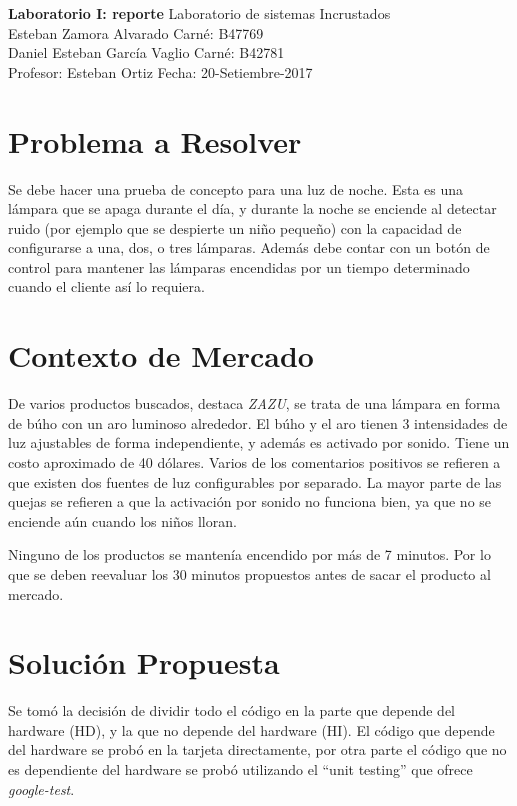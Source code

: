 

\noindent
\large\textbf{Laboratorio I: reporte} \hfill Laboratorio de sistemas Incrustados \\
\normalsize Esteban Zamora Alvarado \hfill Carné: B47769 \\
Daniel Esteban García Vaglio \hfill Carné: B42781 \\
Profesor: Esteban Ortiz  \hfill Fecha: 20-Setiembre-2017 \\

\section{Problema a Resolver}
Se debe hacer una prueba de concepto para una luz de noche. Esta es una lámpara que se apaga durante
el día, y durante la noche se enciende al detectar ruido (por ejemplo que se despierte un niño pequeño)
con la capacidad de configurarse a una, dos, o tres lámparas. Además debe contar con un botón de
control para mantener las lámparas encendidas por un tiempo determinado cuando el cliente así lo
requiera. 

\section{Contexto de Mercado}

De varios productos buscados, destaca \textit{ZAZU}, se trata de una lámpara en forma de búho con un
aro luminoso alrededor. El búho y el aro tienen 3 intensidades de luz ajustables de forma
independiente, y además es activado por sonido. Tiene un costo aproximado de 40 dólares. Varios de
los comentarios positivos se refieren a que existen dos fuentes de luz configurables por
separado. La mayor parte de las quejas se refieren a que la activación por sonido no funciona bien,
ya que no se enciende aún cuando los niños lloran.

Ninguno de los productos se mantenía encendido por más de 7 minutos. Por lo que se deben reevaluar
los 30 minutos propuestos antes de sacar el producto al mercado.

\section{Solución Propuesta}

Se tomó la decisión de dividir todo el código en la parte que depende del hardware (HD), y la que no
depende del hardware (HI).  El código que depende del hardware se probó en la tarjeta directamente, por
otra parte el código que no es dependiente del hardware se probó utilizando el ``unit testing'' que
ofrece \textit{google-test}.

